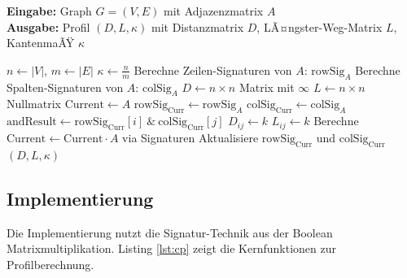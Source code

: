 ﻿\documentclass[a4paper,12pt]{article}
\theoremstyle{definition}
\begin{document}
	\begin{algorithm}[H]
		\caption{VollstÃ¤ndige Profilberechnung}
		\label{alg:profile}
		\textbf{Eingabe:} Graph $G = (V,E)$ mit Adjazenzmatrix $A$ \\
		\textbf{Ausgabe:} Profil $(D, L, \kappa)$ mit Distanzmatrix $D$, LÃ¤ngster-Weg-Matrix $L$, KantenmaÃŸ $\kappa$
		\begin{algorithmic}[1]
			\State $n \gets |V|$, $m \gets |E|$
			\State $\kappa \gets \frac{n}{m}$ 
			\State Berechne Zeilen-Signaturen von $A$: $\text{rowSig}_A$ 
			\State Berechne Spalten-Signaturen von $A$: $\text{colSig}_A$ 
			\State $D \gets n \times n$ Matrix mit $\infty$
			\State $L \gets n \times n$ Nullmatrix
			\State $\text{Current} \gets A$
			\State $\text{rowSig}_{\text{Curr}} \gets \text{rowSig}_A$
			\State $\text{colSig}_{\text{Curr}} \gets \text{colSig}_A$
			\State $\text{andResult} \gets \text{rowSig}_{\text{Curr}}[i] \ \& \ \text{colSig}_{\text{Curr}}[j]$
			\State $D_{ij} \gets k$ 
			\EndIf
			\State $L_{ij} \gets k$ 
			\EndIf
			\EndFor
			\EndFor
			\State Berechne $\text{Current} \gets \text{Current} \cdot A$ via Signaturen
			\State Aktualisiere $\text{rowSig}_{\text{Curr}}$ und $\text{colSig}_{\text{Curr}}$
			\EndFor
			\State \Return $(D, L, \kappa)$
		\end{algorithmic}
	\end{algorithm}
	
	\subsection{Implementierung}
	
	Die Implementierung nutzt die Signatur-Technik aus der Boolean Matrixmultiplikation. Listing \ref{lst:cp} zeigt die Kernfunktionen zur Profilberechnung.
	
\end{document}
